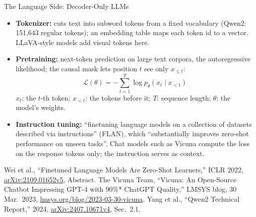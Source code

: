 \begin{frame}{The Language Side: Decoder-Only LLMs}

  {\centering
  \par}
  \vspace{0.2em}
  \begin{itemize}\footnotesize\itemsep0.3em
    \item \textbf{Tokenizer:} cuts text into subword tokens from a fixed vocabulary (Qwen2: 151,643 regular tokens); an embedding table maps each token id to a vector. LLaVA-style models add visual tokens here.
    \item \textbf{Pretraining:} next-token prediction on large text corpora, the autoregressive likelihood; the causal mask lets position $t$ see only $x_{\leq t}$:
    \[ \mathcal{L}(\theta) = -\textstyle\sum_{t=1}^{T} \log p_\theta(x_t \mid x_{<t}) \]
    $x_t$: the $t$-th token; $x_{<t}$: the tokens before it; $T$: sequence length; $\theta$: the model's weights.
    \item \textbf{Instruction tuning:} ``finetuning language models on a collection of datasets described via instructions'' (FLAN), which ``substantially improves zero-shot performance on unseen tasks''. Chat models such as Vicuna compute the loss on the response tokens only; the instruction serves as context.
  \end{itemize}
  \vspace{0.1em}
  {\scriptsize Wei et al., ``Finetuned Language Models Are Zero-Shot Learners,'' ICLR 2022, \href{https://arxiv.org/abs/2109.01652v5}{arXiv:2109.01652v5}, Abstract. The Vicuna Team, ``Vicuna: An Open-Source Chatbot Impressing GPT-4 with 90\%* ChatGPT Quality,'' LMSYS blog, 30 Mar.\ 2023, \href{https://www.lmsys.org/blog/2023-03-30-vicuna/}{lmsys.org/blog/2023-03-30-vicuna}. Yang et al., ``Qwen2 Technical Report,'' 2024, \href{https://arxiv.org/abs/2407.10671v4}{arXiv:2407.10671v4}, Sec.~2.1.\par}
\end{frame}

